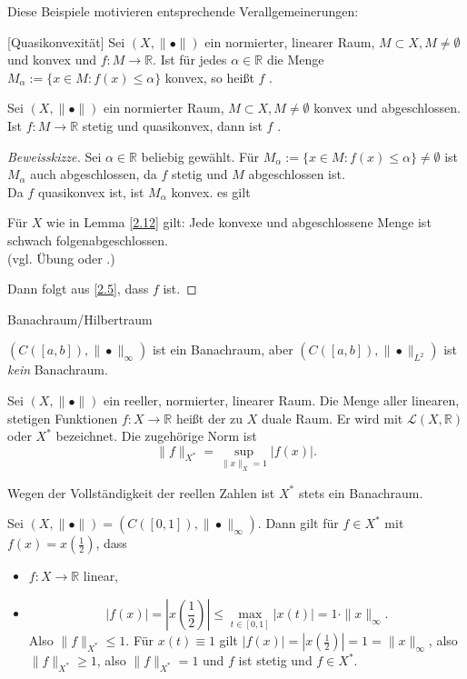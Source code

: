 \documentclass[main.tex]{subfiles}
\begin{document}
Diese Beispiele motivieren entsprechende Verallgemeinerungen:
\begin{mydef}\label{2.11}[Quasikonvexität]
Sei $(X, \|•\|)$ ein normierter, linearer Raum, $M\subset X, M\ne ∅$ und konvex und $f\colon M\to ℝ$. Ist für jedes $α\in ℝ$ die Menge $M_α := \{ x\in M: f(x) \le α\}$ konvex, so heißt $f$ .
\end{mydef}

\begin{lemma}\label{2.12} Sei $(X, \| •\|)$ ein normierter Raum, $M\subset X, M\ne ∅$ konvex und abgeschlossen. Ist $f\colon M\to ℝ$ stetig und quasikonvex, dann ist $f$ \suhs{}.
\end{lemma}

\begin{proof}[Beweisskizze]
Sei $α \in ℝ$ beliebig gewählt.
Für $M_α := \{ x\in M: f(x) \le α\} \ne ∅$ ist $M_α$ auch abgeschlossen, da $f$ stetig und $M$ abgeschlossen ist.\\
Da $f$ quasikonvex ist, ist $M_α$ konvex. es gilt
\begin{lemma*}Für $X$ wie in Lemma \ref{2.12} gilt:
Jede konvexe und abgeschlossene Menge ist schwach folgenabgeschlossen.\\
(vgl. Übung oder \cite{altLinear}.)
\end{lemma*}
Dann folgt aus \ref{2.5}, dass $f$ \suhs{} ist.
\end{proof}

\begin{mydef}\label{2.13}
Banachraum/Hilbertraum
\end{mydef}
\begin{bsp*}
$\left( C([a,b]), \|	• \|_\infty \right)$ ist ein Banachraum, aber $\left( C([a,b]), \|•\|_{L^2} \right)$ ist \emph{kein} Banachraum.
\end{bsp*}


\begin{mydef}\label{2.14}
Sei $(X, \| 	• \|)$ ein reeller, normierter, linearer Raum. Die Menge aller linearen, stetigen Funktionen $f\colon X\to ℝ$ heißt der zu $X$ duale Raum. Er wird mit $\mathcal L(X, ℝ)$ oder $X^*$ bezeichnet. Die zugehörige Norm ist
$$\| f\|_{X^*} = \sup_{\|x\|_X = 1} | f(x)|.$$
\end{mydef}
\begin{bem*}
Wegen der Vollständigkeit der reellen Zahlen ist $X^*$ stets ein Banachraum.
\end{bem*}

\begin{bsp}\label{2.15}
Sei $(X, \|•\|) = \left( C([0,1]), \|•\|_∞ \right)$. Dann gilt für $f\in X^*$ mit $f(x) = x \left( \frac{1}{2} \right)$, dass
\begin{itemize}
\item $f\colon X \to ℝ$ linear,
\item $$|f(x)| = \left| x\left( \frac{1}{2} \right)\right|\le \max_{t\in [0,1]} |x(t)| = 1\cdot \| x \|_∞.$$
Also $\| f\|_{X^*} \le 1.$
Für $x(t) \equiv 1$ gilt $|f(x)| = \left| x\left( \frac{1}{2}\right) \right| = 1 = \| x\|_∞$, also $\|f\|_{X^*} \ge 1$, also $\| f\|_{X^*} = 1$ und $f$ ist stetig und $f\in X^*$. 
\end{itemize}
\end{bsp}
\end{document}

